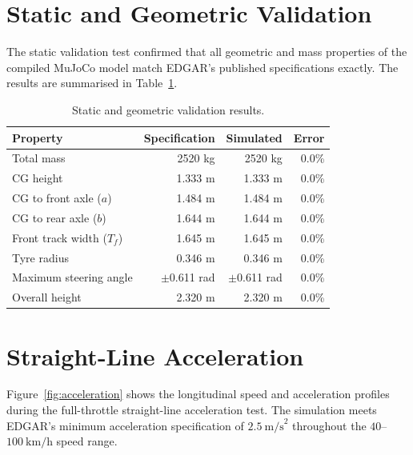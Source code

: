\documentclass[a4paper,12pt]{report}
\begin{document}
\section{Static and Geometric Validation}

The static validation test confirmed that all geometric and mass properties of
the compiled MuJoCo model match EDGAR's published specifications exactly.
The results are summarised in Table~\ref{table:static_results}.

\begin{table}[h]
\centering
\caption{Static and geometric validation results.}
\begin{tabular}{|l|r|r|r|}
\hline
\textbf{Property}           & \textbf{Specification} & \textbf{Simulated} & \textbf{Error} \\ \hline
Total mass                  & 2520 kg                & 2520 kg            & 0.0\%          \\ \hline
CG height                   & 1.333 m                & 1.333 m            & 0.0\%          \\ \hline
CG to front axle ($a$)      & 1.484 m                & 1.484 m            & 0.0\%          \\ \hline
CG to rear axle ($b$)       & 1.644 m                & 1.644 m            & 0.0\%          \\ \hline
Front track width ($T_f$)   & 1.645 m                & 1.645 m            & 0.0\%          \\ \hline
Tyre radius                 & 0.346 m                & 0.346 m            & 0.0\%          \\ \hline
Maximum steering angle      & $\pm$0.611 rad         & $\pm$0.611 rad     & 0.0\%          \\ \hline
Overall height              & 2.320 m                & 2.320 m            & 0.0\%          \\ \hline
\end{tabular}
\label{table:static_results}
\end{table}

\section{Straight-Line Acceleration}

Figure~\ref{fig:acceleration} shows the longitudinal speed and acceleration
profiles during the full-throttle straight-line acceleration test. The
simulation meets EDGAR's minimum acceleration specification of
$2.5\ \text{m/s}^2$ throughout the $40$–$100\ \text{km/h}$ speed range.
\end{document}
